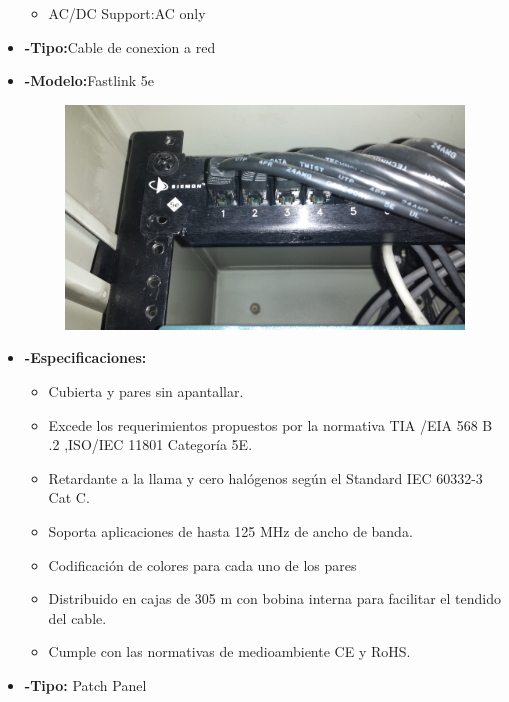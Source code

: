 \documentclass{udpreport}
\begin{document}
\begin{itemize}
\begin{itemize}
			\item AC/DC Support:AC only\\
		\end{itemize}
		\item{\bf-Tipo:}Cable de conexion a red\\
		\item{\bf-Modelo:}Fastlink 5e\\
		\begin{figure}[h]
    		\centering
    	\includegraphics[width=\textwidth]{cablecat5e.jpg}
		\end{figure}
		\item{\bf-Especificaciones:}
		\begin{itemize}
			\item Cubierta y pares sin apantallar.\\
			\item Excede los requerimientos propuestos por la normativa TIA /EIA 568 B .2 ,ISO/IEC 11801 Categoría 5E.\\
			\item Retardante a la llama y cero halógenos según el Standard IEC 60332-3 Cat C.\\
			\item Soporta aplicaciones de hasta 125 MHz de ancho de banda.\\
			\item Codificación de colores para cada uno de los pares\\
			\item Distribuido en cajas de 305 m con bobina interna para facilitar el tendido del cable.\\
			\item Cumple con las normativas de medioambiente CE y RoHS.\\
		\end{itemize}
		\item{\bf-Tipo:} Patch Panel\\

\end{itemize}
\end{document}
